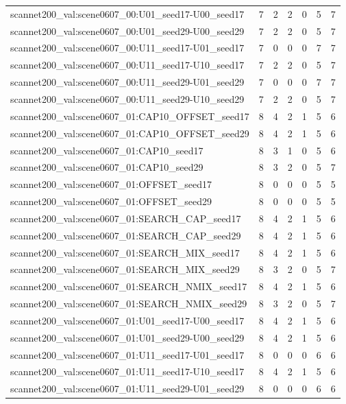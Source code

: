 \begin{table}[t]
\begin{tabular}{lrrrrrr}
scannet200\_val:scene0607\_00:U01\_seed17-U00\_seed17 & 7 & 2 & 2 & 0 & 5 & 7 \\
scannet200\_val:scene0607\_00:U01\_seed29-U00\_seed29 & 7 & 2 & 2 & 0 & 5 & 7 \\
scannet200\_val:scene0607\_00:U11\_seed17-U01\_seed17 & 7 & 0 & 0 & 0 & 7 & 7 \\
scannet200\_val:scene0607\_00:U11\_seed17-U10\_seed17 & 7 & 2 & 2 & 0 & 5 & 7 \\
scannet200\_val:scene0607\_00:U11\_seed29-U01\_seed29 & 7 & 0 & 0 & 0 & 7 & 7 \\
scannet200\_val:scene0607\_00:U11\_seed29-U10\_seed29 & 7 & 2 & 2 & 0 & 5 & 7 \\
scannet200\_val:scene0607\_01:CAP10\_OFFSET\_seed17 & 8 & 4 & 2 & 1 & 5 & 6 \\
scannet200\_val:scene0607\_01:CAP10\_OFFSET\_seed29 & 8 & 4 & 2 & 1 & 5 & 6 \\
scannet200\_val:scene0607\_01:CAP10\_seed17 & 8 & 3 & 1 & 0 & 5 & 6 \\
scannet200\_val:scene0607\_01:CAP10\_seed29 & 8 & 3 & 2 & 0 & 5 & 7 \\
scannet200\_val:scene0607\_01:OFFSET\_seed17 & 8 & 0 & 0 & 0 & 5 & 5 \\
scannet200\_val:scene0607\_01:OFFSET\_seed29 & 8 & 0 & 0 & 0 & 5 & 5 \\
scannet200\_val:scene0607\_01:SEARCH\_CAP\_seed17 & 8 & 4 & 2 & 1 & 5 & 6 \\
scannet200\_val:scene0607\_01:SEARCH\_CAP\_seed29 & 8 & 4 & 2 & 1 & 5 & 6 \\
scannet200\_val:scene0607\_01:SEARCH\_MIX\_seed17 & 8 & 4 & 2 & 1 & 5 & 6 \\
scannet200\_val:scene0607\_01:SEARCH\_MIX\_seed29 & 8 & 3 & 2 & 0 & 5 & 7 \\
scannet200\_val:scene0607\_01:SEARCH\_NMIX\_seed17 & 8 & 4 & 2 & 1 & 5 & 6 \\
scannet200\_val:scene0607\_01:SEARCH\_NMIX\_seed29 & 8 & 3 & 2 & 0 & 5 & 7 \\
scannet200\_val:scene0607\_01:U01\_seed17-U00\_seed17 & 8 & 4 & 2 & 1 & 5 & 6 \\
scannet200\_val:scene0607\_01:U01\_seed29-U00\_seed29 & 8 & 4 & 2 & 1 & 5 & 6 \\
scannet200\_val:scene0607\_01:U11\_seed17-U01\_seed17 & 8 & 0 & 0 & 0 & 6 & 6 \\
scannet200\_val:scene0607\_01:U11\_seed17-U10\_seed17 & 8 & 4 & 2 & 1 & 5 & 6 \\
scannet200\_val:scene0607\_01:U11\_seed29-U01\_seed29 & 8 & 0 & 0 & 0 & 6 & 6 \\

\end{tabular}
\end{table}
